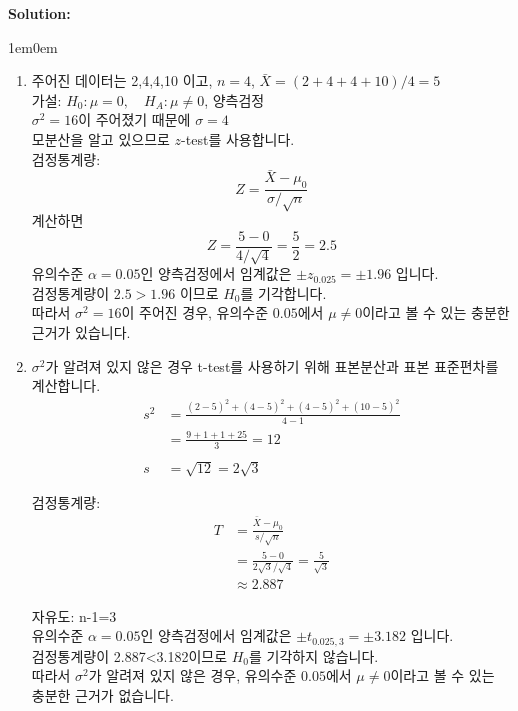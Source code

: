 \documentclass{article}
\newenvironment{solution}
{
    \par\medskip
    \noindent\textbf{Solution:}
    \begin{adjustwidth}{1em}{0em}
}
{
    \end{adjustwidth}
    \medskip
}
\begin{document}
\begin{enumerate}[label=\textbf{\arabic*.}, leftmargin=*]
    \begin{solution}
        \begin{enumerate}[label=(\alph*), leftmargin=2em, itemsep=1em]
            
            \item
                주어진 데이터는 {2,4,4,10} 이고,  $n=4$, $\bar X=(2+4+4+10)/4=5$\\  
                가설: $H_0:\mu=0,\quad H_A:\mu\ne 0$, 양측검정  \\
                $\sigma^2=16$이 주어졌기 때문에 $\sigma=4$ \\
                모분산을 알고 있으므로 $z$-test를 사용합니다. \\ 
                검정통계량:
                $$  
                Z=\frac{\bar X-\mu_0}{\sigma/\sqrt n}  
                $$  
                계산하면  
                $$  
                Z=\frac{5-0}{4/\sqrt4}=\frac{5}{2}=2.5  
                $$  
                유의수준 $\alpha=0.05$인 양측검정에서 임계값은 $\pm z_{0.025}=\pm 1.96$ 입니다. \\
                검정통계량이 $2.5>1.96$ 이므로 $H_0$를 기각합니다.  \\
                따라서 $\sigma^2=16$이 주어진 경우, 유의수준 $0.05$에서 $\mu\ne0$이라고 볼 수 있는 충분한 근거가 있습니다.  


            \item
                $\sigma^2$가 알려져 있지 않은 경우 t-test를 사용하기 위해 표본분산과 표본 표준편차를 계산합니다.
                \begin{align*}
                    s^2&=\frac{(2-5)^2+(4-5)^2+(4-5)^2+(10-5)^2}{4-1}  \\
                    &=\frac{9+1+1+25}{3}=12 \\
                    \\
                    s&=\sqrt{12}=2\sqrt3
                \end{align*}

                검정통계량:   
                \begin{align*}
                    T&=\frac{\bar X-\mu_0}{s/\sqrt n}  \\
                    &=\frac{5-0}{2\sqrt3/\sqrt4}=\frac{5}{\sqrt3}    \\
                    &\approx 2.887  
                \end{align*}

                자유도: n-1=3  \\
                유의수준 $\alpha=0.05$인 양측검정에서 임계값은 $\pm t_{0.025,3}=\pm 3.182$ 입니다.\\  
                검정통계량이 2.887<3.182이므로 $H_0$를 기각하지 않습니다.  \\
                따라서 $\sigma^2$가 알려져 있지 않은 경우, 유의수준 $0.05$에서 $\mu\ne0$이라고 볼 수 있는 충분한 근거가 없습니다.
        \end{enumerate}
    \end{solution}
    




\end{enumerate}
\end{document}
